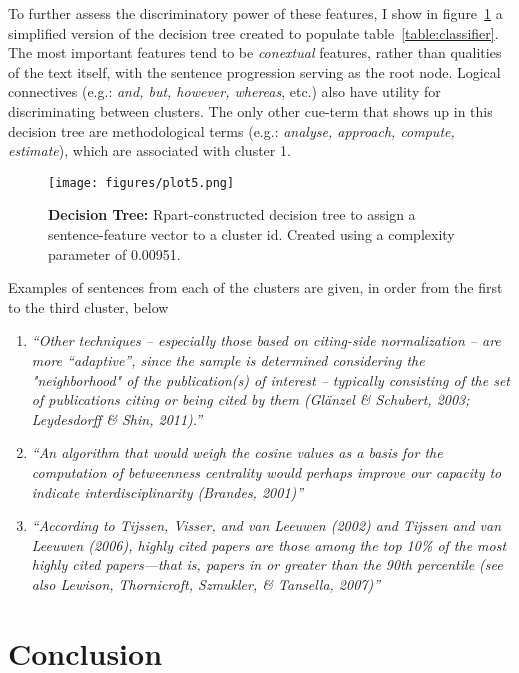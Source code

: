 \documentclass[
10pt, %
a4paper, %
oneside, %
headinclude,footinclude, %
BCOR5mm, %
]{scrartcl}
\begin{document}
To further assess the discriminatory power of these features, I show in figure~\ref{fig:decision_tree} a simplified version of the decision tree created to populate table~\ref{table:classifier}. The most important features tend to be \textit{conextual} features, rather than qualities of the text itself, with the sentence progression serving as the root node. Logical connectives (e.g.: \textit{and, but, however, whereas}, etc.) also have utility for discriminating between clusters. The only other cue-term that shows up in this decision tree are methodological terms (e.g.: \textit{analyse, approach, compute, estimate}), which are associated with cluster 1. 

\begin{figure}[h]
	\centering
	\texttt{[image: figures/plot5.png]}
	\caption{\textbf{Decision Tree:} Rpart-constructed decision tree to assign a sentence-feature vector to a cluster id. Created using a complexity parameter of 0.00951. }
	\label{fig:decision_tree}
\end{figure}

\newpage

Examples of sentences from each of the clusters are given, in order from the first to the third cluster, below

\begin{enumerate}
\item \textit{“Other techniques – especially those based on citing-side normalization – are more “adaptive”, since the sample is determined considering the "neighborhood" of the publication(s) of interest – typically consisting of the set of publications citing or being cited by them (Glänzel \& Schubert, 2003; Leydesdorff \& Shin, 2011).”}

\item \textit{“An algorithm that would weigh the cosine values as a basis for the computation of betweenness centrality would perhaps improve our capacity to indicate interdisciplinarity (Brandes, 2001)”}

\item \textit{“According to Tijssen, Visser, and van Leeuwen (2002) and Tijssen and van Leeuwen (2006), highly cited papers are those among the top 10\% of the most highly cited papers—that is, papers in or greater than the 90th percentile (see also Lewison, Thornicroft, Szmukler, \& Tansella, 2007)”}

\end{enumerate}

\section{Conclusion}
\end{document}
